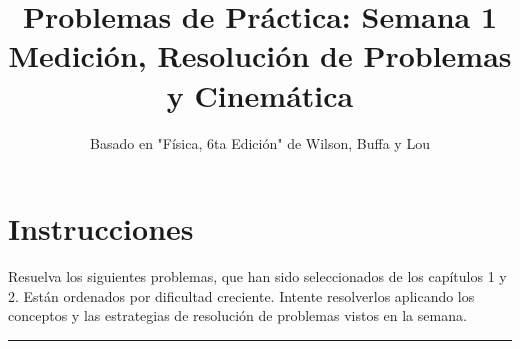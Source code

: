 \documentclass[12pt, a4paper]{article}
\begin{document}
\title{\bfseries Problemas de Práctica: Semana 1 \\ \large Medición, Resolución de Problemas y Cinemática}
\author{Basado en "Física, 6ta Edición" de Wilson, Buffa y Lou}
\date{}
\maketitle
\thispagestyle{empty}
\vspace{-1cm}

\section*{Instrucciones}
Resuelva los siguientes problemas, que han sido seleccionados de los capítulos 1 y 2. Están ordenados por dificultad creciente. Intente resolverlos aplicando los conceptos y las estrategias de resolución de problemas vistos en la semana.

\hrule
\vspace{1cm}
\end{document}
